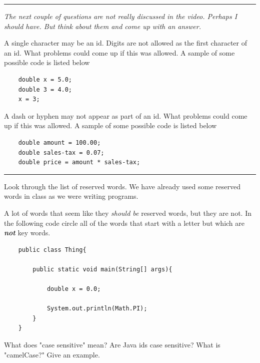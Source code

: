 \documentclass[letterpaper,11pt]{exam}
\begin{document}
\begin{questions}
 \begin{samepage}
    \rule{1.\textwidth}{0.4pt}

\textit{The next couple of questions are not really discussed in the video.  Perhaps I should have.  But think about them and come up with an answer.}

 \question A single character may be an id.  Digits are not allowed as the first character of an id. What problems could come up if this was allowed.  A sample of some possible code is listed below
 \begin{verbatim}
    double x = 5.0;
    double 3 = 4.0;
    x = 3;
 \end{verbatim} 
 \question A dash or hyphen may not appear as part of an id.   What problems could come up if this was allowed.  A sample of some possible code is listed below
 \begin{verbatim}
    double amount = 100.00;
    double sales-tax = 0.07;
    double price = amount * sales-tax;
 \end{verbatim} 
\end{samepage}

\rule{1.0\textwidth}{0.4pt}
\question Look through the list of reserved words.  We have already used some reserved words in class as we were writing programs.  

\begin{samepage}
\question A lot of words that seem like they \textit{should be} reserved words, but they are not.  In the following code circle all of the words that start with a letter but which are \textbf{\textit{not}} key words.

\begin{verbatim}
    public class Thing{

        public static void main(String[] args){
            
            double x = 0.0;

            System.out.println(Math.PI);
        }
    }
\end{verbatim}
\end{samepage}
\question What does "case sensitive" mean?  Are Java ids case sensitive?
\question What is "camelCase?"  Give an example.


\end{questions}
\end{document}
